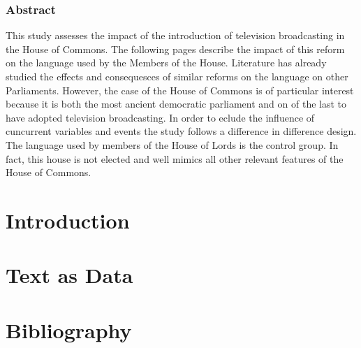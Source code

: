\documentclass[a4paper,11pt]{article}
\begin{document}


\newpage

\section*{Abstract}
This study assesses the impact of the introduction of television broadcasting in the House of Commons. The following pages describe the impact of this reform on the language used by the Members of the House. Literature has already studied the effects and consequesces of similar reforms on the language on other Parliaments. However, the case of the House of Commons is of particular interest because it is both the most ancient democratic parliament and on of the last to have adopted television broadcasting. In order to eclude the influence of cuncurrent variables and events the study follows a difference in difference design. The language used by members of the House of Lords is the control group. In fact, this house is not elected and well mimics all other relevant features of the House of Commons.

\clearpage

\clearpage
\setcounter{tocdepth}{2}
\tableofcontents
\clearpage
\setcounter{page}{1}
\pagestyle{fancy}

\part{Introduction}



\newpage
\part{Text as Data}




\newpage
\part{Bibliography}
\printbibliography[type=book, title={\large Books}]
\printbibliography[type=article, title={\large Articles}]


\end{document}
